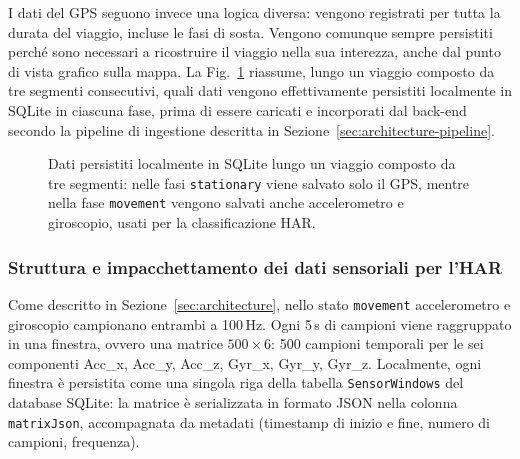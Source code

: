 \documentclass[conference]{IEEEtran}
\begin{document}
I dati del GPS seguono invece una logica diversa: vengono registrati
per tutta la durata del viaggio, incluse le fasi di sosta.
Vengono comunque sempre persistiti perché sono
necessari a ricostruire il viaggio nella sua interezza, anche dal
punto di vista grafico sulla mappa. La Fig.~\ref{fig:sensor-timeline}
riassume, lungo un viaggio composto da tre segmenti consecutivi, quali
dati vengono effettivamente persistiti localmente in SQLite in
ciascuna fase, prima di essere caricati e incorporati dal back-end
secondo la pipeline di ingestione descritta in
Sezione~\ref{sec:architecture-pipeline}.

\begin{figure}[htbp]
\centering
{}
\caption{Dati persistiti localmente in SQLite lungo un viaggio
composto da tre segmenti: nelle fasi \texttt{stationary} viene
salvato solo il GPS, mentre nella fase \texttt{movement} vengono
salvati anche accelerometro e giroscopio, usati per la
classificazione HAR.}
\label{fig:sensor-timeline}
\end{figure}
\FloatBarrier

\subsubsection{Struttura e impacchettamento dei dati sensoriali per l'HAR}

Come descritto in Sezione~\ref{sec:architecture}, nello stato
\texttt{movement} accelerometro e giroscopio campionano entrambi a
100\,Hz. Ogni 5\,s di campioni viene raggruppato in una finestra,
ovvero una matrice $500 \times 6$: 500 campioni temporali per le sei
componenti Acc\_x, Acc\_y, Acc\_z, Gyr\_x, Gyr\_y, Gyr\_z. Localmente,
ogni finestra è persistita come una singola riga della tabella
\texttt{SensorWindows} del database SQLite: la matrice è serializzata
in formato JSON nella colonna \texttt{matrixJson}, accompagnata da
metadati (timestamp di inizio e fine, numero di campioni, frequenza).
\end{document}
